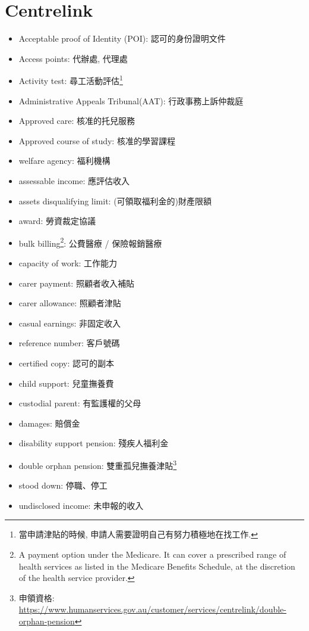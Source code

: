 \section{Centrelink}
\begin{multicols}{2}
\begin{itemize}
  \itemsep0em
  \item Acceptable proof of Identity (POI): 認可的身份證明文件
  \item Access points: 代辦處, 代理處
  \item Activity test: 尋工活動評估\footnote{當申請津貼的時候, 申請人需要證明自己有努力積極地在找工作.}
  \item Administrative Appeals Tribunal(AAT): 行政事務上訴仲裁庭
  \item Approved care: 核准的托兒服務
  \item Approved course of study: 核准的學習課程
  \item welfare agency: 福利機構
  \item assessable income: 應評估收入
  \item assets disqualifying limit: (可領取福利金的)財產限額
  \item award: 勞資裁定協議
  \item bulk billing\footnote{A payment option under the Medicare. It can cover a prescribed range of health services as listed in the Medicare Benefits Schedule, at the discretion of the health service provider.}: 公費醫療 / 保險報銷醫療
  \item capacity of work: 工作能力
  \item carer payment: 照顧者收入補貼
  \item carer allowance: 照顧者津貼
  \item casual earnings: 非固定收入
  \item reference number: 客戶號碼
  \item certified copy: 認可的副本
  \item child support: 兒童撫養費
  \item custodial parent: 有監護權的父母
  \item damages: 賠償金
  \item disability support pension: 殘疾人福利金
  \item double orphan pension: 雙重孤兒撫養津貼\footnote{申領資格: \url{https://www.humanservices.gov.au/customer/services/centrelink/double-orphan-pension}}
  \item stood down: 停職、停工
  \item undisclosed income: 未申報的收入

\end{itemize}
\end{multicols}
